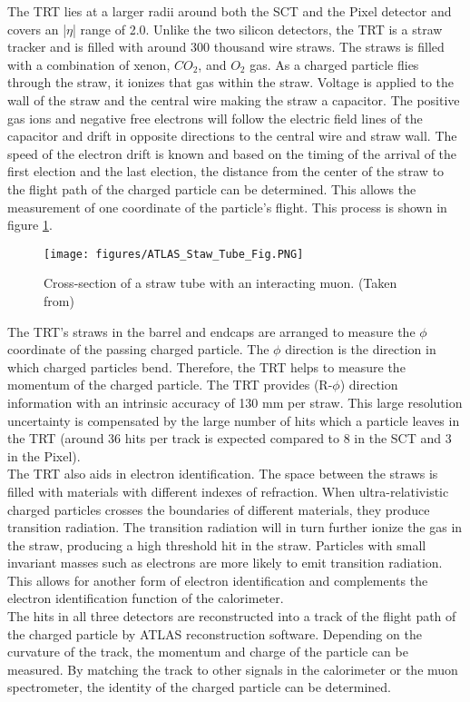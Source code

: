 \indent The TRT lies at a larger radii around both the SCT and the Pixel detector and covers an |$\eta$| range of 2.0. Unlike the two silicon detectors, the TRT is a straw tracker and is filled with around 300 thousand wire straws. The straws is filled with a combination of xenon, $CO_2$, and $O_2$ gas. As a charged particle flies through the straw, it ionizes that gas within the straw. Voltage is applied to the wall of the straw and the central wire making the straw a capacitor. The positive gas ions and negative free electrons will follow the electric field lines of the capacitor and drift in opposite directions to the central wire and straw wall. The speed of the electron drift is known and based on the timing of the arrival of the first election and the last election, the distance from the center of the straw to the flight path of the charged particle can be determined. This allows the measurement of one coordinate of the particle's flight. This process is shown in figure \ref{LHC:fig:StrawTube}. \cite{biblio:JINST} ~\\
\begin{figure}[h!]
\centering
\texttt{[image: figures/ATLAS\_Staw\_Tube\_Fig.PNG]}
\\
\caption{ Cross-section of a straw tube with an interacting muon. (Taken from\cite{biblio:JINST}) \label{LHC:fig:StrawTube}}
\end{figure}

\indent The TRT's straws in the barrel and endcaps are arranged to measure the $\phi$ coordinate of the passing charged particle. The $\phi$ direction is the direction in which charged particles bend. Therefore, the TRT helps to measure the momentum of the charged particle. The TRT provides (R-$\phi$) direction information with an intrinsic accuracy of 130 mm per straw. This large resolution uncertainty is compensated by the large number of hits which a particle leaves in the TRT (around 36 hits per track is expected compared to 8 in the SCT and 3 in the Pixel). ~\\
\indent The TRT also aids in electron identification. The space between the straws is filled with materials with different indexes of refraction. When ultra-relativistic charged particles crosses the boundaries of different materials, they produce transition radiation. The transition radiation will in turn further ionize the gas in the straw, producing a high threshold hit in the straw. Particles with small invariant masses such as electrons are more likely to emit transition radiation. This allows for another form of electron identification and complements the electron identification function of the calorimeter. ~\\
\indent The hits in all three detectors are reconstructed into a track of the flight path of the charged particle by ATLAS reconstruction software. Depending on the curvature of the track, the momentum and charge of the particle can be measured. By matching the track to other signals in the calorimeter or the muon spectrometer, the identity of the charged particle can be determined. ~\\
